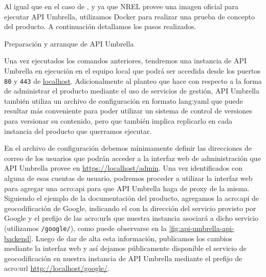 Al igual que en el caso de , y ya que NREL provee una imagen oficial para ejecutar API Umbrella, utilizamos Docker para realizar una prueba de concepto del producto. A continuación detallamos los pasos realizados.

\begin{listing}[H]
  \caption{Preparación y arranque de API Umbrella}
  \label{soa:tecnologias:api-umbrella:bash-preparacion}
\end{listing}

Una vez ejecutados los comandos anteriores, tendremos una instancia de API Umbrella en ejecución en el equipo local que podrá ser accedida desde los puertos \texttt{80} y \texttt{443} de \url{localhost}. Adicionalmente al planteo que  hace con respecto a la forma de administrar el producto mediante el uso de servicios de gestión, API Umbrella también utiliza un archivo de configuración en formato \gls{lang:yaml} que puede resultar más conveniente para poder utilizar un sistema de control de versiones para versionar su contenido, pero que también implica replicarlo en cada instancia del producto que querramos ejecutar.

En el archivo de configuración debemos mínimamente definir las direcciones de correo de los usuarios que podrán acceder a la interfaz web de administración que API Umbrella provee en \url{https://localhost/admin}. Una vez identificados con alguna de esas cuentas de usuario, podremos proceder a utilizar la interfaz web para agregar una \gls{acro:api} para que API Umbrella haga de proxy de la misma. Siguiendo el ejemplo de la documentación del producto, agregamos la \gls{acro:api} de geocodificación de Google, indicando el  con la dirección del servicio provisto por Google y el prefijo de las \glspl{acro:url} que nuestra instancia asociará a dicho servicio (utilizamos \texttt{/google/}), como puede observarse en la \autoref{fig:api-umbrella-api-backend}. Luego de dar de alta esta información, publicamos los cambios mediante la interfaz web y así dejamos públicamente disponible el servicio de geocodificación en nuestra instancia de API Umbrella mediante el prefijo de \gls{acro:url} \url{http://localhost/google/}.

